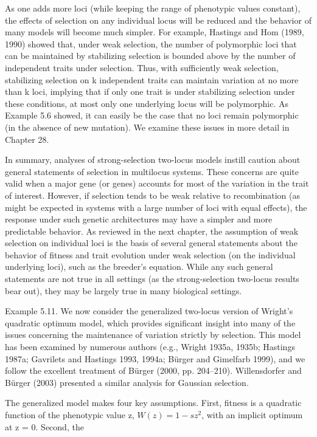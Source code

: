 \documentclass{article}
\begin{document}
As one adds more loci (while keeping the range of phenotypic values constant), the effects of selection on any individual locus will be reduced and the behavior of many models will become much simpler. For example, Hastings and Hom (1989, 1990) showed that, under weak selection, the number of polymorphic loci that can be maintained by stabilizing selection is bounded above by the number of independent traits under selection. Thus, with sufficiently weak selection, stabilizing selection on k independent traits can maintain variation at no more than k loci, implying that if only one trait is under stabilizing selection under these conditions, at most only one underlying locus will be polymorphic. As Example 5.6 showed, it can easily be the case that no loci remain polymorphic (in the absence of new mutation). We examine these issues in more detail in Chapter 28.

In summary, analyses of strong-selection two-locus models instill caution about general statements of selection in multilocus systems. These concerns are quite valid when a major gene (or genes) accounts for most of the variation in the trait of interest. However, if selection tends to be weak relative to recombination (as might be expected in systems with a large number of loci with equal effects), the response under such genetic architectures may have a simpler and more predictable behavior. As reviewed in the next chapter, the assumption of weak selection on individual loci is the basis of several general statements about the behavior of fitness and trait evolution under weak selection (on the individual underlying loci), such as the breeder's equation. While any such general statements are not true in all settings (as the strong-selection two-locus results bear out), they may be largely true in many biological settings.

Example 5.11. We now consider the generalized two-locus version of Wright's quadratic optimum model, which provides significant insight into many of the issues concerning the maintenance of variation strictly by selection. This model has been examined by numerous authors (e.g., Wright 1935a, 1935b; Hastings 1987a; Gavrilets and Hastings 1993, 1994a; Bürger and Gimelfarb 1999), and we follow the excellent treatment of Bürger (2000, pp. 204–210). Willensdorfer and Bürger (2003) presented a similar analysis for Gaussian selection.

The generalized model makes four key assumptions. First, fitness is a quadratic function of the phenotypic value z,  $ W(z) = 1 - sz^2 $, with an implicit optimum at z = 0. Second, the
\end{document}
